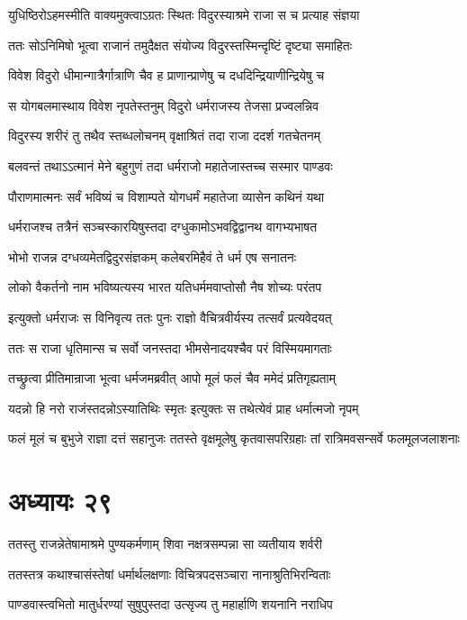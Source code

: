 \twolineshloka
{युधिष्ठिरोऽहमस्मीति वाक्यमुक्त्वाऽग्रतः स्थितः}
{विदुरस्याश्रमे राजा स च प्रत्याह संज्ञया}


\twolineshloka
{ततः सोऽनिमिषो भूत्वा राजानं तमुदैक्षत}
{संयोज्य विदुरस्तस्मिन्दृष्टिं दृष्ट्या समाहितः}


\twolineshloka
{विवेश विदुरो धीमान्गात्रैर्गात्राणि चैव ह}
{प्राणान्प्राणेषु च दधदिन्द्रियाणीन्द्रियेषु च}


\twolineshloka
{स योगबलमास्थाय विवेश नृपतेस्तनुम्}
{विदुरो धर्मराजस्य तेजसा प्रज्वलन्निव}


\twolineshloka
{विदुरस्य शरीरं तु तथैव स्तब्धलोचनम्}
{वृक्षाश्रितं तदा राजा ददर्श गतचेतनम्}


\twolineshloka
{बलवन्तं तथाऽऽत्मानं मेने बहुगुणं तदा}
{धर्मराजो महातेजास्तच्च सस्मार पाण्डवः}


\twolineshloka
{पौराणमात्मनः सर्वं भविष्यं च विशाम्पते}
{योगधर्मं महातेजा व्यासेन कथिनं यथा}


\twolineshloka
{धर्मराजश्च तत्रैनं सञ्चस्कारयिषुस्तदा}
{दग्धुकामोऽभवद्विद्वानथ वागभ्यभाषत}


\twolineshloka
{भोभो राजन्न दग्धव्यमेतद्विदुरसंज्ञकम्}
{कलेबरमिहैवं ते धर्म एष सनातनः}


\twolineshloka
{लोको वैकर्तनो नाम भविष्यत्यस्य भारत}
{यतिधर्ममवाप्तोसौ नैष शोच्यः परंतप}


\twolineshloka
{इत्युक्तो धर्मराजः स विनिवृत्य ततः पुनः}
{राज्ञो वैचित्रवीर्यस्य तत्सर्वं प्रत्यवेदयत्}


\twolineshloka
{ततः स राजा धृतिमान्स च सर्वो जनस्तदा}
{भीमसेनादयश्चैव परं विस्मियमागताः}


\twolineshloka
{तच्छ्रुत्वा प्रीतिमान्राजा भूत्वा धर्मजमब्रवीत्}
{आपो मूलं फलं चैव ममेदं प्रतिगृह्यताम्}


\twolineshloka
{यदन्नो हि नरो राजंस्तदन्नोऽस्यातिथिः स्मृतः}
{इत्युक्तः स तथेत्येवं प्राह धर्मात्मजो नृपम्}


\threelineshloka
{फलं मूलं च बुभुजे राज्ञा दत्तं सहानुजः}
{ततस्ते वृक्षमूलेषु कृतवासपरिग्रहाः}
{तां रात्रिमवसन्सर्वे फलमूलजलाशनाः}


\chapter{अध्यायः २९}
\twolineshloka
{ततस्तु राजन्नेतेषामाश्रमे पुण्यकर्मणाम्}
{शिवा नक्षत्रसम्पन्ना सा व्यतीयाय शर्वरी}


\twolineshloka
{ततस्तत्र कथाश्चासंस्तेषां धर्मार्थलक्षणाः}
{विचित्रपदसञ्चारा नानाश्रुतिभिरन्विताः}


\twolineshloka
{पाण्डवास्त्वभितो मातुर्धरण्यां सुषुपुस्तदा}
{उत्सृज्य तु महार्हाणि शयनानि नराधिप}


